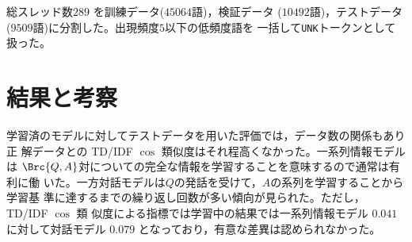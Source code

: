 \documentclass[twocolumn]{jarticle}
\begin{document}
総スレッド数$289$ を訓練データ($45064$語)，検証データ
($10492$語)，テストデータ($9509$語)に分割した。出現頻度$5$以下の低頻度語を
一括して{\tt UNK}トークンとして扱った。


\section{結果と考察}
学習済のモデルに対してテストデータを用いた評価では，データ数の関係もあり正
解データとの TD/IDF $\cos$ 類似度はそれ程高くなかった。一系列情報モデルは
$\Brc{Q,A}$対についての完全な情報を学習することを意味するので通常は有利に働
いた。一方対話モデルは$Q$の発話を受けて，$A$の系列を学習することから学習基
準に達するまでの繰り返し回数が多い傾向が見られた。ただし，TD/IDF $\cos$ 類
似度による指標では学習中の結果では一系列情報モデル $0.041$ に対して対話モデル $0.079$
となっており，有意な差異は認められなかった。
\end{document}
